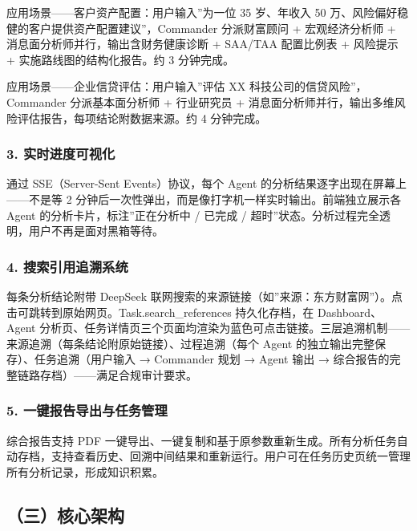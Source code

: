 \documentclass[
]{ctexart}
\begin{document}
应用场景------客户资产配置：用户输入''为一位 35 岁、年收入 50
万、风险偏好稳健的客户提供资产配置建议''，Commander 分派财富顾问 +
宏观经济分析师 + 消息面分析师并行，输出含财务健康诊断 + SAA/TAA
配置比例表 + 风险提示 + 实施路线图的结构化报告。约 3 分钟完成。

应用场景------企业信贷评估：用户输入''评估 XX
科技公司的信贷风险''，Commander 分派基本面分析师 + 行业研究员 +
消息面分析师并行，输出多维风险评估报告，每项结论附数据来源。约 4
分钟完成。

\subsubsection{3.
实时进度可视化}\label{ux5b9eux65f6ux8fdbux5ea6ux53efux89c6ux5316}

通过 SSE（Server-Sent Events）协议，每个 Agent
的分析结果逐字出现在屏幕上------不是等 2
分钟后一次性弹出，而是像打字机一样实时输出。前端独立展示各 Agent
的分析卡片，标注''正在分析中 / 已完成 /
超时''状态。分析过程完全透明，用户不再是面对黑箱等待。

\subsubsection{4.
搜索引用追溯系统}\label{ux641cux7d22ux5f15ux7528ux8ffdux6eafux7cfbux7edf}

每条分析结论附带 DeepSeek
联网搜索的来源链接（如''来源：东方财富网''）。点击可跳转到原始网页。Task.search\_references
持久化存档，在 Dashboard、Agent
分析页、任务详情页三个页面均渲染为蓝色可点击链接。三层追溯机制------来源追溯（每条结论附原始链接）、过程追溯（每个
Agent 的独立输出完整保存）、任务追溯（用户输入 → Commander 规划 → Agent
输出 → 综合报告的完整链路存档）------满足合规审计要求。

\subsubsection{5.
一键报告导出与任务管理}\label{ux4e00ux952eux62a5ux544aux5bfcux51faux4e0eux4efbux52a1ux7ba1ux7406}

综合报告支持 PDF
一键导出、一键复制和基于原参数重新生成。所有分析任务自动存档，支持查看历史、回溯中间结果和重新运行。用户可在任务历史页统一管理所有分析记录，形成知识积累。

\subsection{（三）核心架构}\label{ux4e09ux6838ux5fc3ux67b6ux6784}
\end{document}
